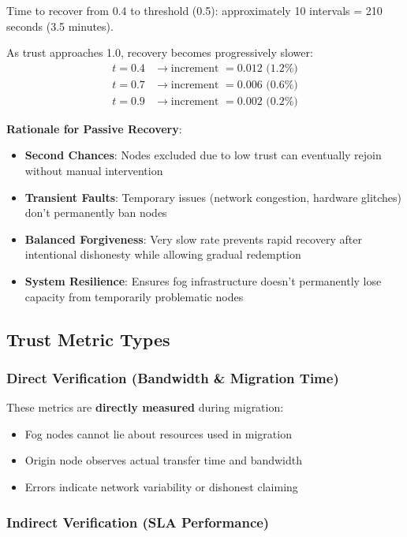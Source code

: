 \documentclass[12pt,a4paper]{article}
\begin{document}
Time to recover from 0.4 to threshold (0.5): approximately 10 intervals = 210 seconds (3.5 minutes).

As trust approaches 1.0, recovery becomes progressively slower:
\begin{align}
    t = 0.4 &\rightarrow \text{increment } = 0.012 \text{ (1.2\%)} \\
    t = 0.7 &\rightarrow \text{increment } = 0.006 \text{ (0.6\%)} \\
    t = 0.9 &\rightarrow \text{increment } = 0.002 \text{ (0.2\%)}
\end{align}

\textbf{Rationale for Passive Recovery}:
\begin{itemize}
    \item \textbf{Second Chances}: Nodes excluded due to low trust can eventually rejoin without manual intervention
    \item \textbf{Transient Faults}: Temporary issues (network congestion, hardware glitches) don't permanently ban nodes
    \item \textbf{Balanced Forgiveness}: Very slow rate prevents rapid recovery after intentional dishonesty while allowing gradual redemption
    \item \textbf{System Resilience}: Ensures fog infrastructure doesn't permanently lose capacity from temporarily problematic nodes
\end{itemize}

\subsection{Trust Metric Types}

\subsubsection{Direct Verification (Bandwidth \& Migration Time)}

These metrics are \textbf{directly measured} during migration:
\begin{itemize}
    \item Fog nodes cannot lie about resources used in migration
    \item Origin node observes actual transfer time and bandwidth
    \item Errors indicate network variability or dishonest claiming
\end{itemize}

\subsubsection{Indirect Verification (SLA Performance)}
\end{document}
